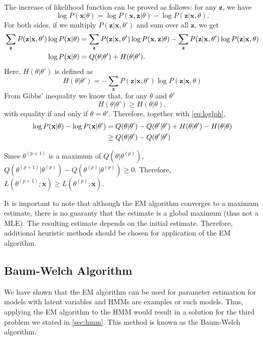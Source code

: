 \documentclass[12pt,final,twoside]{report}
\theoremstyle{plain}
\theoremstyle{definition}
\theoremstyle{remark}
\begin{document}
The increase of likelihood function can be proved as follows: for any $\mathbf{z}$, we have
\begin{equation}
  \log P(\mathbf{x}|\theta) = \log P(\mathbf{x},\mathbf{z}|\theta) - \log P(\mathbf{z}|\mathbf{x},\theta). 
\end{equation}
For both sides, if we multiply $P(\mathbf{z}|\mathbf{x},\theta')$ and sum over all $\mathbf{z}$, we get
\begin{align}
  \sum_{\mathbf{z}} P(\mathbf{z}|\mathbf{x},\theta') \log P(\mathbf{x}|\theta) 
    &= \sum_{\mathbf{z}} P(\mathbf{z}|\mathbf{x},\theta') \log P(\mathbf{x},\mathbf{z}|\theta)
    - \sum_{\mathbf{z}} P(\mathbf{z}|\mathbf{x},\theta') \log P(\mathbf{z}|\mathbf{x},\theta) \notag\\
  \log P(\mathbf{x}|\theta) &= Q(\theta|\theta') + H(\theta|\theta')
  \label{eq:loglph}.
\end{align}
Here, $H(\theta|\theta')$ is defined as
\begin{equation}
  H(\theta|\theta') = - \sum_{\mathbf{z}} P(\mathbf{z}|\mathbf{x},\theta') \log P(\mathbf{z}|\mathbf{x},\theta)
\end{equation}
From Gibbs' inequality we know that, for any $\theta$ and $\theta'$
\begin{equation}
  H(\theta|\theta') \geq H(\theta|\theta),
\end{equation}
with equality if and only if $\theta = \theta'$. Therefore, together with \cref{eq:loglph},
\begin{align}
  \log P(\mathbf{x}|\theta) - \log P(\mathbf{x}|\theta') &= Q(\theta|\theta') - Q(\theta'|\theta') + H(\theta|\theta') -  H(\theta|\theta) \notag\\
  & \geq Q(\theta|\theta') - Q(\theta'|\theta')
\end{align}

Since $\theta^{(p+1)}$ is a maximum of $Q(\theta|\theta^{(p)})$, $Q(\theta^{(p+1)}|\theta^{(p)}) - Q(\theta^{(p)}|\theta^{(p)}) \geq 0$. Therefore, $L(\theta^{(p+1)};\mathbf{x}) \geq L(\theta^{(p)};\mathbf{x})$.
  
It is important to note that although the EM algorithm converges to a maximum estimate, there is no guaranty that the estimate is a global maximum (thus not a MLE). The resulting estimate depends on the initial estimate. Therefore, additional heuristic methods should be chosen for application of the EM algorithm.

\subsection{Baum-Welch Algorithm}
We have shown that the EM algorithm can be used for parameter estimation for models with latent variables and HMMs are examples or such models. Thus, applying the EM algorithm to the HMM would result in a solution for the third problem we stated in \cref{sec:hmm}. This method is known as the Baum-Welch algorithm.
\end{document}
